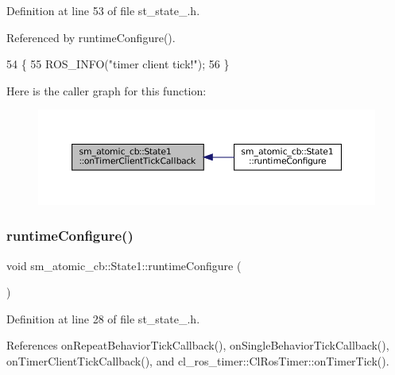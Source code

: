 Definition at line 53 of file st\+\_\+state\+\_.\+h.



Referenced by runtime\+Configure().


\begin{DoxyCode}
54     \{
55         ROS\_INFO(\textcolor{stringliteral}{"timer client tick!"});
56     \}
\end{DoxyCode}
Here is the caller graph for this function\+:
\nopagebreak
\begin{figure}[H]
\begin{center}
\leavevmode
\includegraphics[width=350pt]{structsm__atomic__cb_1_1State1_a1e1f3cc8c74bc13e28ce47f133c2cecb_icgraph}
\end{center}
\end{figure}
\mbox{\label{structsm__atomic__cb_1_1State1_a72dd5ac4a82271c55f1f3b07870746aa}} 
\subsubsection{\texorpdfstring{runtime\+Configure()}{runtimeConfigure()}}
{\footnotesize\ttfamily void sm\+\_\+atomic\+\_\+cb\+::\+State1\+::runtime\+Configure (\begin{DoxyParamCaption}{ }\end{DoxyParamCaption})\hspace{0.3cm}{\ttfamily [inline]}}



Definition at line 28 of file st\+\_\+state\+\_.\+h.



References on\+Repeat\+Behavior\+Tick\+Callback(), on\+Single\+Behavior\+Tick\+Callback(), on\+Timer\+Client\+Tick\+Callback(), and cl\+\_\+ros\+\_\+timer\+::\+Cl\+Ros\+Timer\+::on\+Timer\+Tick().


